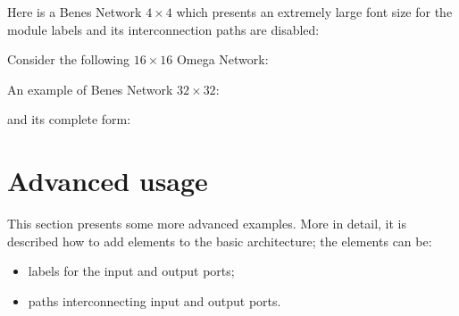\documentclass{ltxdoc}
\begin{document}
Here is a Benes Network $4 \times 4$ which presents an extremely large font size for the module labels and its interconnection paths are disabled:
\begin{codeexample}[]
\tikzset{my style, P=4, 
 module font=\huge\slshape, 
 connections disabled=true
}
\end{codeexample}

Consider the following $16 \times 16$ Omega Network:
\begin{codeexample}[]
\tikzset{module size=0.6cm,pin length factor=0.6,
         module ysep=0.65, module xsep=3.5,}
\end{codeexample}

\pagebreak

An example of Benes Network $32 \times 32$:
\begin{codeexample}[]
\tikzset{module size=0.6cm,pin length factor=0.6,
         module ysep=0.9, module xsep=1.7,}
\begin{tikzpicture}[P=32]
    \node[benes] {};
\end{tikzpicture}
\end{codeexample}
\pagebreak

and its complete form:
\begin{codeexample}[]
\tikzset{module size=0.6cm,pin length factor=0.6,
         module ysep=1, module xsep=2.275}
\begin{tikzpicture}[P=32]
    \node[benes complete={module label opacity=0}] {};
\end{tikzpicture}
\end{codeexample}


\section{Advanced usage}
This section presents some more advanced examples. More in detail, it is described how to add elements to the basic architecture; the elements can be:
\begin{itemize}
\item labels for the input and output ports;
\item paths interconnecting input and output ports.
\end{itemize}
\end{document}
